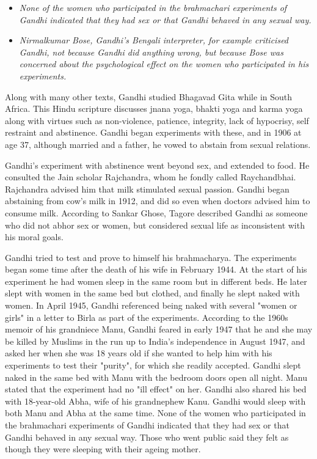 \begin{itemize}
\item
  \emph{None of the women who participated in the brahmachari
  experiments of Gandhi indicated that they had sex or that Gandhi
  behaved in any sexual way.}
\item
  \emph{Nirmalkumar Bose, Gandhi's Bengali interpreter, for example
  criticised Gandhi, not because Gandhi did anything wrong, but because
  Bose was concerned about the psychological effect on the women who
  participated in his experiments.}
\end{itemize}

Along with many other texts, Gandhi studied Bhagavad Gita while in South
Africa. This Hindu scripture discusses jnana yoga, bhakti yoga and karma
yoga along with virtues such as non-violence, patience, integrity, lack
of hypocrisy, self restraint and abstinence. Gandhi began experiments
with these, and in 1906 at age 37, although married and a father, he
vowed to abstain from sexual relations.

Gandhi's experiment with abstinence went beyond sex, and extended to
food. He consulted the Jain scholar Rajchandra, whom he fondly called
Raychandbhai. Rajchandra advised him that milk stimulated sexual
passion. Gandhi began abstaining from cow's milk in 1912, and did so
even when doctors advised him to consume milk. According to Sankar
Ghose, Tagore described Gandhi as someone who did not abhor sex or
women, but considered sexual life as inconsistent with his moral goals.

Gandhi tried to test and prove to himself his brahmacharya. The
experiments began some time after the death of his wife in February
1944. At the start of his experiment he had women sleep in the same room
but in different beds. He later slept with women in the same bed but
clothed, and finally he slept naked with women. In April 1945, Gandhi
referenced being naked with several "women or girls" in a letter to
Birla as part of the experiments. According to the 1960s memoir of his
grandniece Manu, Gandhi feared in early 1947 that he and she may be
killed by Muslims in the run up to India's independence in August 1947,
and asked her when she was 18 years old if she wanted to help him with
his experiments to test their "purity", for which she readily accepted.
Gandhi slept naked in the same bed with Manu with the bedroom doors open
all night. Manu stated that the experiment had no "ill effect" on her.
Gandhi also shared his bed with 18-year-old Abha, wife of his
grandnephew Kanu. Gandhi would sleep with both Manu and Abha at the same
time. None of the women who participated in the brahmachari experiments
of Gandhi indicated that they had sex or that Gandhi behaved in any
sexual way. Those who went public said they felt as though they were
sleeping with their ageing mother.

